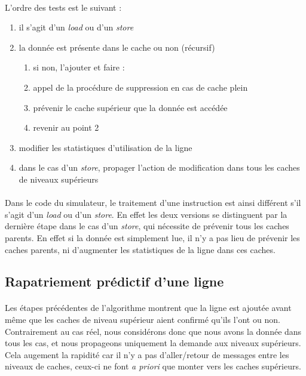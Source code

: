 \paragraph{}
L'ordre des tests est le suivant : 
\begin{enumerate}
  \item{il s'agit d'un \emph{load} ou d'un \emph{store}}
  \item{la donnée est présente dans le cache ou non (récursif)
    \begin{enumerate}
      \item{si non, l'ajouter et faire :}
      \item{appel de la procédure de suppression en cas de cache plein}
      \item{prévenir le cache supérieur que la donnée est accédée}
      \item{revenir au point 2}
  \end{enumerate}}
  \item{modifier les statistiques d'utilisation de la ligne}
  \item{dans le cas d'un \emph{store}, propager l'action de modification dans tous les caches de niveaux supérieurs}
\end{enumerate}

\paragraph{}
Dans le code du simulateur, le traitement d'une instruction est ainsi différent s'il s'agit d'un \emph{load} ou d'un \emph{store}. En effet les deux versions se distinguent par la dernière étape dans le cas d'un \emph{store}, qui nécessite de prévenir tous les caches parents. En effet si la donnée est simplement lue, il n'y a pas lieu de prévenir les caches parents, ni d'augmenter les statistiques de la ligne dans ces caches.

\subsection{Rapatriement prédictif d'une ligne}

\paragraph{}
Les étapes précédentes de l'algorithme montrent que la ligne est ajoutée avant même que les caches de niveau supérieur aient confirmé qu'ils l'ont ou non. Contrairement au cas réel, nous considérons donc que nous avons la donnée dans tous les cas, et nous propageons uniquement la demande aux niveaux supérieurs. Cela augement la rapidité car il n'y a pas d'aller/retour de messages entre les niveaux de caches, ceux-ci ne font \emph{a priori} que monter vers les caches supérieurs.

